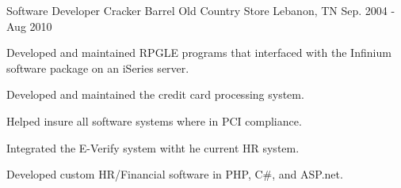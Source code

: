 \begin{cventries}
{\begin{cvitems}
      \end{cvitems} 
    }
  \cventry
    {Software Developer}
    {Cracker Barrel Old Country Store}
    {Lebanon, TN}
    {Sep. 2004 - Aug 2010}
    {
      \begin{cvitems}
        \item {Developed and maintained RPGLE programs that interfaced with the Infinium software package on an iSeries server.}
        \item {Developed and maintained the credit card processing system.}
        \item {Helped insure all software systems where in PCI compliance.}
        \item {Integrated the E-Verify system witht he current HR system.}
        \item {Developed custom HR/Financial software in PHP, C\#, and ASP.net.}
      \end{cvitems}
    }
\end{cventries}
